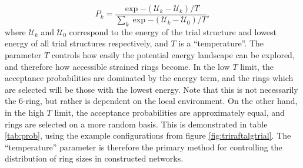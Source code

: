 \begin{equation}
	\label{eq:probdist}
	P_k=\frac{ \exp{-\left(\mathcal{U}_{k}-\mathcal{U}_k\right)/T}}{\sum\limits_{k}\exp{-\left(\mathcal{U}_{k}-\mathcal{U}_{0}\right)/T}},
\end{equation}
where $\mathcal{U}_k$ and $\mathcal{U}_{0}$ correspond to the energy of the trial structure and lowest energy of all trial structures respectively, and $T$ is a ``temperature''. 
The parameter $T$ controls how easily the potential energy landscape can be explored, and therefore how accessible strained rings become. 
In the low $T$ limit, the acceptance probabilities are dominated by the energy term, and the rings which are selected will be those with the lowest energy. 
Note that this is not necessarily the 6-ring, but rather is dependent on the local environment. On the other hand, in the high $T$ limit, the acceptance probabilities are approximately equal, and rings are selected on a more random basis. 
This is demonstrated in table \ref{tab:prob}, using the example configurations from figure \ref{fig:triraftalgtrial}. 
The ``temperature'' parameter is therefore the primary method for controlling the distribution of ring sizes in constructed networks.

